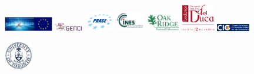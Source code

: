 \begin{figure}[htbp]
%
\noindent \begin{centering}
\includegraphics[width=0.190\textwidth]{figures/logo_European_Union.png}\vspace*{2truemm}
\includegraphics[width=0.112\textwidth]{figures/logo_GENCI.jpg}\vspace*{2truemm}
\includegraphics[width=0.112\textwidth]{figures/logo_PRACE.jpg}\vspace*{2truemm}
\includegraphics[width=0.112\textwidth]{figures/logo_CINES.png}\vspace*{2truemm}
\includegraphics[width=0.130\textwidth]{figures/logo_Oak_Ridge.png}\vspace*{2truemm}
\hspace*{3mm}\includegraphics[width=0.130\textwidth]{figures/logo_fondation_Del_Duca.png}\vspace*{2truemm}
\includegraphics[width=0.130\textwidth]{figures/logo_CIG.png}\vspace*{2truemm}
\par\end{centering}
%
\vspace*{-2truemm}
%
\noindent \begin{centering}
\includegraphics[width=0.112\textwidth]{figures/logo_University_of_Toronto.jpg}\vspace*{2truemm}

\end{centering}
\end{figure}
